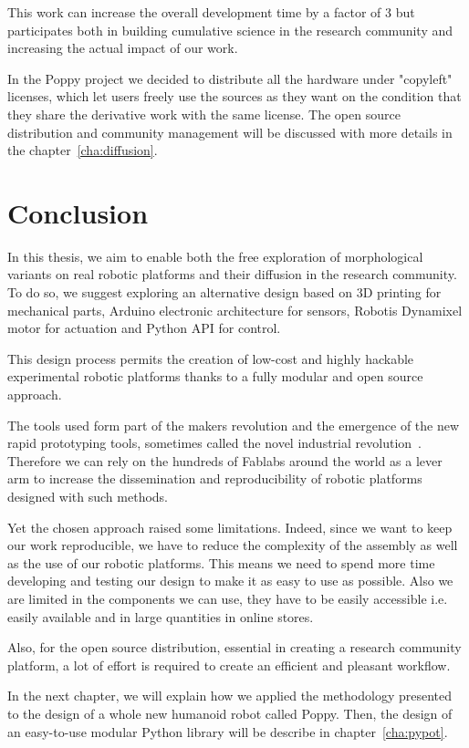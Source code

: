 This work can increase the overall development time by a factor of 3 but participates both in building cumulative science in the research community and increasing the actual impact of our work.

In the Poppy project we decided to distribute all the hardware under "copyleft" licenses, which let users freely use the sources as they want on the condition that they share the derivative work with the same license.
The open source distribution and community management will be discussed with more details in the chapter~\ref{cha:diffusion}.


\section{Conclusion} %

In this thesis, we aim to enable both the free exploration of morphological variants on real robotic platforms and their diffusion in the research community. To do so, we suggest exploring an alternative design based on 3D printing for mechanical parts, Arduino electronic architecture for sensors, Robotis Dynamixel motor for actuation and Python API for control.

This design process permits the creation of low-cost and highly hackable experimental robotic platforms thanks to a fully modular and open source approach.

The tools used form part of the makers revolution and the emergence of the new rapid prototyping tools, sometimes called the novel industrial revolution~\parencite{anderson2012makers}. Therefore we can rely on the hundreds of Fablabs around the world as a lever arm to increase the dissemination and reproducibility of robotic platforms designed with such methods.

Yet the chosen approach raised some limitations. Indeed, since we want to keep our work reproducible, we have to reduce the complexity of the assembly as well as the use of our robotic platforms. This means we need to spend more time developing and testing our design to make it as easy to use as possible. Also we are limited in the components we can use, they have to be easily accessible i.e. easily available and in large quantities in online stores.

Also, for the open source distribution, essential in creating a research community platform, a lot of effort is required to create an efficient and pleasant workflow.

In the next chapter, we will explain how we applied the methodology presented to the design of a whole new humanoid robot called Poppy. Then, the design of an easy-to-use modular Python library will be describe in chapter~\ref{cha:pypot}.





